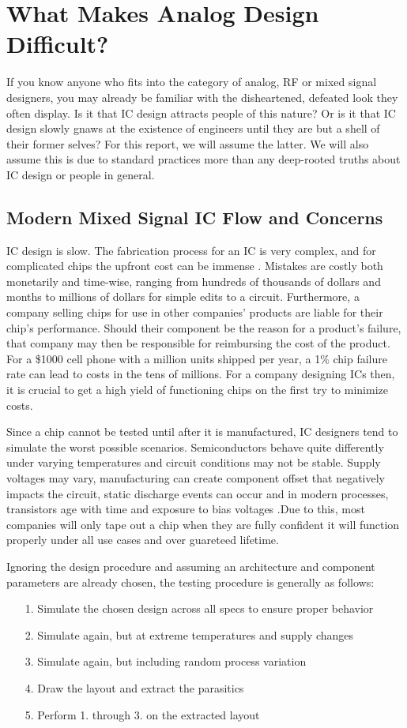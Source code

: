 \chapter{What Makes Analog Design Difficult?}

If you know anyone who fits into the category of analog, RF or mixed signal designers, you may already be familiar with the disheartened, defeated look they often display. Is it that IC design attracts people of this nature? Or is it that IC design slowly gnaws at the existence of engineers until they are but a shell of their former selves? For this report, we will assume the latter. We will also assume this is due to standard practices more than any deep-rooted truths about IC design or people in general.

\section{Modern Mixed Signal IC Flow and Concerns}
IC design is slow. The fabrication process for an IC is very complex, and for complicated chips the upfront cost can be immense \cite{elder_real_nodate}. Mistakes are costly both monetarily and time-wise, ranging from hundreds of thousands of dollars and months to millions of dollars for simple edits to a circuit. Furthermore, a company selling chips for use in other companies' products are liable for their chip's performance. Should their component be the reason for a product's failure, that company may then be responsible for reimbursing the cost of the product. For a \$1000 cell phone with a million units shipped per year, a 1\% chip failure rate can lead to costs in the tens of millions. For a company designing ICs then, it is crucial to get a high yield of functioning chips on the first try to minimize costs.

Since a chip cannot be tested until after it is manufactured, IC designers tend to simulate the worst possible scenarios. Semiconductors behave quite differently under varying temperatures and circuit conditions may not be stable. Supply voltages may vary, manufacturing can create component offset that negatively impacts the circuit, static discharge events can occur and in modern processes, transistors age with time and exposure to bias voltages .Due to this, most companies will only tape out a chip when they are fully confident it will function properly under all use cases and over guareteed lifetime. 

Ignoring the design procedure and assuming an architecture and component parameters are already chosen, the testing procedure is generally as follows:
\begin{itemize}
\item[1.] Simulate the chosen design across all specs to ensure proper behavior
\item[2.] Simulate again, but at extreme temperatures and supply changes
\item[3.] Simulate again, but including random process variation
\item[4.] Draw the layout and extract the parasitics
\item[5.] Perform 1. through 3. on the extracted layout
\end{itemize}

